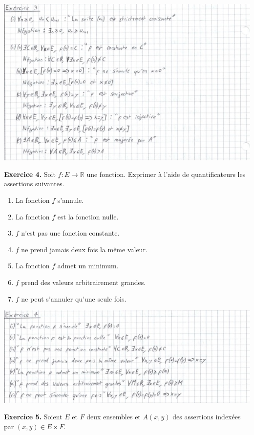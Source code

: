 \documentclass[a4paper, 10pt]{report}
\begin{document}
	\includegraphics{ex03.jpg}
	
	\newpage
	
	\noindent
	\textbf{Exercice 4.} Soit $f : E \to \mathbb{R}$ une fonction.
	Exprimer à l'aide de quantificateurs les assertions suivantes.
	
	\begin{enumerate}[label=(\roman*)]
		\item La fonction $f$ s'annule.
		\item La fonction $f$ est la fonction nulle.
		\item $f$ n'est pas une fonction constante.
		\item $f$ ne prend jamais deux fois la même valeur.
		\item La fonction $f$ admet un minimum.
		\item $f$ prend des valeurs arbitrairement grandes.
		\item $f$ ne peut s'annuler qu'une seule fois.
	\end{enumerate}
	
	\includegraphics{ex04.jpg}
	
	\vspace{5mm}
	\noindent
	\textbf{Exercice 5.} Soient $E$ et $F$ deux ensembles et
	$A(x, y)$ des assertions indexées par $(x, y) \in E \times F$.
	
\end{document}
